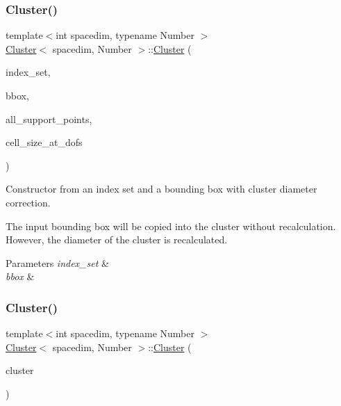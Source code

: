 \subsubsection{\texorpdfstring{Cluster()}{Cluster()}\hspace{0.1cm}{\footnotesize\ttfamily [6/7]}}
{\footnotesize\ttfamily template$<$int spacedim, typename Number $>$ \\
\hyperlink{classCluster}{Cluster}$<$ spacedim, Number $>$\+::\hyperlink{classCluster}{Cluster} (\begin{DoxyParamCaption}\item[{const std\+::vector$<$ types\+::global\+\_\+dof\+\_\+index $>$ \&}]{index\+\_\+set,  }\item[{const \hyperlink{classSimpleBoundingBox}{Simple\+Bounding\+Box}$<$ spacedim, Number $>$ \&}]{bbox,  }\item[{const std\+::vector$<$ Point$<$ spacedim, Number $>$$>$ \&}]{all\+\_\+support\+\_\+points,  }\item[{const std\+::vector$<$ Number $>$ \&}]{cell\+\_\+size\+\_\+at\+\_\+dofs }\end{DoxyParamCaption})}

Constructor from an index set and a bounding box with cluster diameter correction.

The input bounding box will be copied into the cluster without recalculation. However, the diameter of the cluster is recalculated. 
\begin{DoxyParams}{Parameters}
{\em index\+\_\+set} & \\
\hline
{\em bbox} & \\
\hline
\end{DoxyParams}
\mbox{\label{classCluster_a27a372b05916f136ff9fe3e5a92a4362}} 
\subsubsection{\texorpdfstring{Cluster()}{Cluster()}\hspace{0.1cm}{\footnotesize\ttfamily [7/7]}}
{\footnotesize\ttfamily template$<$int spacedim, typename Number $>$ \\
\hyperlink{classCluster}{Cluster}$<$ spacedim, Number $>$\+::\hyperlink{classCluster}{Cluster} (\begin{DoxyParamCaption}\item[{const \hyperlink{classCluster}{Cluster}$<$ spacedim, Number $>$ \&}]{cluster }\end{DoxyParamCaption})}

